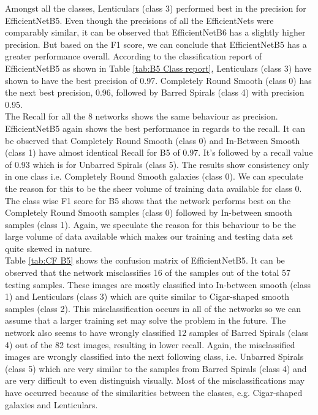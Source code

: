 \documentclass[fleqn,usenatbib]{mnras}
\begin{document}
Amongst all the classes, Lenticulars (class 3) performed best in the precision for EfficientNetB5. Even though the precisions of all the EfficientNets were comparably similar, it can be observed that EfficientNetB6 has a slightly higher precision. But based on the F1 score, we can conclude that EfficientNetB5 has a greater performance overall. According to the classification report of EfficientNetB5 as shown in Table \ref{tab:B5 Class report}, Lenticulars (class 3) have shown to have the best precision of 0.97. Completely Round Smooth (class 0) has the next best precision, 0.96, followed by Barred Spirals (class 4) with precision 0.95.\\
\hspace*{0.25 in}The Recall for all the 8 networks shows the same behaviour as precision. EfficientNetB5 again shows the best performance in regards to the recall. It can be observed that Completely Round Smooth (class 0) and In-Between Smooth (class 1) have almost identical Recall for B5 of 0.97. It's followed by a recall value of 0.93 which is for Unbarred Spirals (class 5). The results show consistency only in one class i.e. Completely Round Smooth galaxies (class 0). We can speculate the reason for this to be the sheer volume of training data available for class 0. The class wise F1 score for B5 shows that the network performs best on the Completely Round Smooth samples (class 0) followed by In-between smooth samples (class 1). Again, we speculate the reason for this behaviour to be the large volume of data available which makes our training and testing data set quite skewed in nature.\\

\hspace*{0.25 in}Table \ref{tab:CF B5} shows the confusion matrix of EfficientNetB5. It can be observed that the network misclassifies 16 of the samples out of the total 57 testing samples. These images are mostly classified into In-between smooth (class 1) and Lenticulars (class 3) which are quite similar to Cigar-shaped smooth samples (class 2). This misclassification occurs in all of the networks so we can assume that a larger training set may solve the problem in the future. The network also seems to have wrongly classified 12 samples of Barred Spirals (class 4) out of the 82 test images, resulting in lower recall. Again, the misclassified images are wrongly classified into the next following class, i.e. Unbarred Spirals (class 5) which are very similar to the samples from Barred Spirals (class 4) and are very difficult to even distinguish visually. Most of the misclassifications may have occurred because of the similarities between the classes, e.g. Cigar-shaped galaxies and Lenticulars. \\
\end{document}

